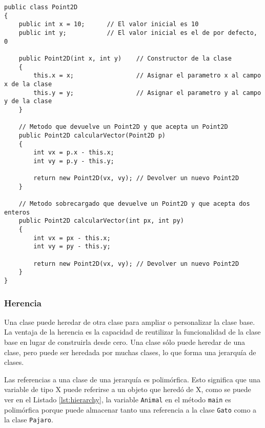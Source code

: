 \documentclass{pre-tfg}
\begin{document}
\begin{spacing}{1}
\begin{lstlisting}[float=htbp, caption={Ejemplo de clase con campos, sobrecarga de métodos y constructor}, label=lst:classwhole]
public class Point2D 
{ 
	public int x = 10;  	// El valor inicial es 10
	public int y;       	// El valor inicial es el de por defecto, 0
	
	public Point2D(int x, int y)    // Constructor de la clase
	{
		this.x = x; 			    // Asignar el parametro x al campo x de la clase
		this.y = y; 			    // Asignar el parametro y al campo y de la clase
	}
	
	// Metodo que devuelve un Point2D y que acepta un Point2D	
	public Point2D calcularVector(Point2D p)
	{
		int vx = p.x - this.x;
		int vy = p.y - this.y;
		
		return new Point2D(vx, vy); // Devolver un nuevo Point2D
	}
	
	// Metodo sobrecargado que devuelve un Point2D y que acepta dos enteros	
	public Point2D calcularVector(int px, int py)
	{
		int vx = px - this.x;
		int vy = py - this.y;
		
		return new Point2D(vx, vy); // Devolver un nuevo Point2D
	}
}
\end{lstlisting}
\end{spacing}

\subsubsection{Herencia}

Una clase puede heredar de otra clase para ampliar o personalizar la clase base. La ventaja de la herencia es la capacidad de reutilizar la funcionalidad de la clase base en lugar de construirla desde cero. Una clase sólo puede heredar de una clase, pero puede ser heredada por muchas clases, lo que forma una jerarquía de clases.

Las referencias a una clase de una jerarquía es polimórfica. Esto significa que una variable de tipo X puede referirse a un objeto que heredó de X, como se puede ver en el Listado \ref{lst:hierarchy}, la variable \texttt{Animal} en el método \texttt{main} es polimórfica porque puede almacenar tanto una referencia a la clase \texttt{Gato} como a la clase \texttt{Pajaro}.
\end{document}
